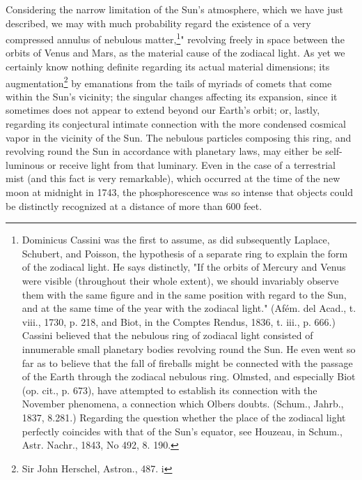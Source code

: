 Considering the narrow limitation of the Sun's atmosphere, which we have just described, we may with much probability regard the existence of a very compressed annulus of nebulous matter,\footnote{Dominicus Cassini was the first to assume, as did subsequently Laplace, Schubert, and Poisson, the hypothesis of a separate ring to explain the form of the zodiacal light. He says distinctly, "If the orbits of Mercury and Venus were visible (throughout their whole extent), we should invariably observe them with the same figure and in the same position with regard to the Sun, and at the same time of the year with the zodiacal light." (Af\'{e}m. del Acad., t. viii., 1730, p. 218, and Biot, in the Comptes Rendus, 1836, t. iii., p. 666.) Cassini believed that the nebulous ring of zodiacal light consisted of innumerable small planetary bodies revolving round the Sun. He even went so far as to believe that the fall of fireballs might be connected with the passage of the Earth through the zodiacal nebulous ring. Olmsted, and especially Biot (op. cit., p. 673), have attempted to establish its connection with the November phenomena, a connection which Olbers doubts. (Schum., Jahrb., 1837, 8.281.) Regarding the question whether the place of the zodiacal light perfectly coincides with that of the Sun's equator, see Houzeau, in Schum., Astr. Nachr., 1843, No 492, 8. 190.}" revolving freely in space between the orbits of Venus and Mars, as the material cause of the zodiacal light. As yet we certainly know nothing definite regarding its actual material dimensions; its augmentation\footnote{Sir John Herschel, Astron., 487. i} by emanations from the tails of myriads of comets that come within the Sun's vicinity; the singular changes affecting its expansion, since it sometimes does not appear to extend beyond our Earth's orbit; or, lastly, regarding its conjectural intimate connection with the more condensed cosmical vapor in the vicinity of the Sun. The nebulous particles composing this ring, and revolving round the Sun in accordance with planetary laws, may either be self-luminous or receive light from that luminary. Even in the case of a terrestrial mist (and this fact is very remarkable), which occurred at the time of the new moon at midnight in 1743, the phosphorescence was so intense that objects could be distinctly recognized at a distance of more than 600 feet.

